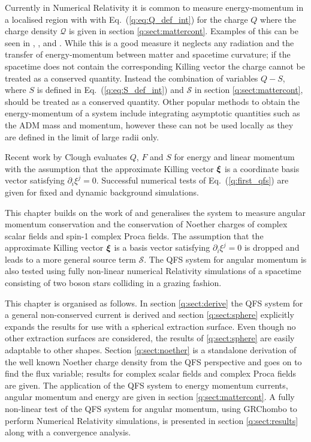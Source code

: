 Currently in Numerical Relativity it is common to measure energy-momentum in a localised region with with Eq.~(\ref{q:eq:Q_def_int}) for the charge $Q$ where the charge density $\mathcal{Q}$ is given in section \ref{q:sect:mattercont}. Examples of this can be seen in \cite{Sanchis_Gual_2019}, \cite{Di_Giovanni_2020},  \cite{PhysRevD.103.044059} and \cite{PhysRevD.96.024004}. While this is a good measure it neglects any radiation and the transfer of energy-momentum between matter and spacetime curvature; if the spacetime does not contain the corresponding Killing vector the charge cannot be treated as a conserved quantity. Instead the combination of variables $Q-S$, where $S$ is defined in Eq.~(\ref{q:eq:S_def_int}) and $\mathcal{S}$ in section \ref{q:sect:mattercont}, should be treated as a conserved quantity. Other popular methods to obtain the energy-momentum of a system include integrating asymptotic quantities such as the ADM mass and momentum, however these can not be used locally as they are defined in the limit of large radii only.

Recent work by Clough \cite{Clough_2021} evaluates $Q$, $F$ and $S$ for energy and linear momentum with the assumption that the approximate Killing vector $\boldsymbol{\xi}$ is a coordinate basis vector satisfying ${\partial_i \xi^j} =0$. Successful numerical tests of Eq.~(\ref{q:first_qfs}) are given for fixed and dynamic background simulations.

This chapter builds on the work of \cite{Clough_2021} and generalises the system to measure angular momentum conservation and the conservation of Noether charges of complex scalar fields and spin-1 complex Proca fields. The assumption that the approximate Killing vector $\boldsymbol{\xi}$ is a basis vector satisfying $\partial_i \xi^j = 0$ is dropped and leads to a more general source term $\mathcal{S}$. The QFS system for angular momentum is also tested using fully non-linear numerical Relativity simulations of a spacetime consisting of two boson stars colliding in a grazing fashion.

This chapter is organised as follows. In section \ref{q:sect:derive} the QFS system for a general non-conserved current is derived and section \ref{q:sect:sphere} explicitly expands the results for use with a spherical extraction surface. Even though no other extraction surfaces are considered, the results of \ref{q:sect:sphere} are easily adaptable  to other shapes. Section \ref{q:sect:noether} is a standalone derivation of the well known Noether charge density from the QFS perspective and goes on to find the flux variable; results for complex scalar fields and complex Proca fields are given. The application of the QFS system to energy momentum currents, angular momentum and energy are given in section \ref{q:sect:mattercont}. A fully non-linear test of the QFS system for angular momentum, using {\sc GRChombo} \cite{clough2015grchombo} \cite{Andrade2021} to perform Numerical Relativity simulations, is presented in section \ref{q:sect:results} along with a convergence analysis.











